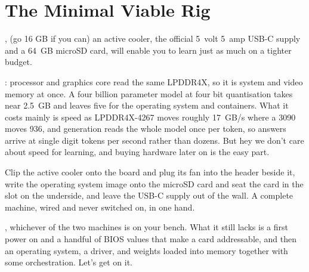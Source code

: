 
\newpage
\section{The Minimal Viable Rig}

, (go 16 GB if you can) an active cooler, the official
5~volt 5~amp USB-C supply and a 64~GB microSD card\cite{raspberrypiPi5}, 
will enable you to learn just as much on a tighter budget.


: processor and graphics core read the same
LPDDR4X, so it is system and video memory at once. A four billion parameter model at
four bit quantisation takes near 2.5~GB and leaves five for the operating system and
containers. What it costs mainly is speed as 
LPDDR4X-4267 moves roughly 17~GB/s where a 3090 moves 936, and generation reads
the whole model once per token, so answers arrive at single digit tokens per
second rather than dozens. But hey we don't care about speed for learning, 
and buying hardware later on is the easy part.

 Clip the active cooler onto the board and plug
its fan into the header beside it, write the operating system image onto the microSD
card and seat the card in the slot on the underside, and leave the USB-C supply out of
the wall. A complete machine, wired and never switched on, in one hand.


\vfill
{}, whichever of the two machines is on
your bench. What it still lacks is a first power on and a handful of BIOS values
that make a card addressable, and then an operating system, a driver, and weights
loaded into memory together with some orchestration. Let's get on it.
